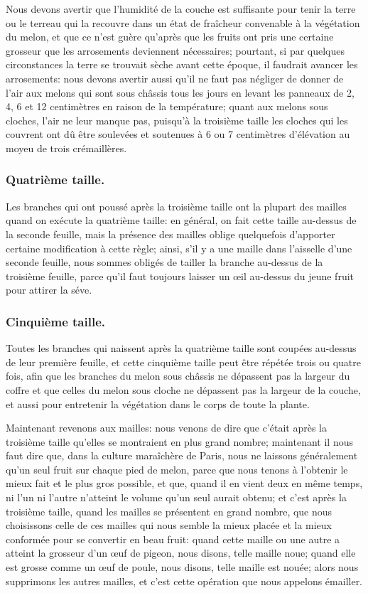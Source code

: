 \documentclass[10pt,a4paper]{book}
\begin{document}
Nous devons avertir que l'humidité de la couche est suffisante pour tenir la terre ou le terreau qui la recouvre dans un état de fraîcheur convenable à la végétation du melon, et que ce n'est guère qu'après que les fruits ont pris une certaine grosseur que les arrosements deviennent nécessaires; pourtant, si par quelques circonstances la terre se trouvait sèche avant cette époque, il faudrait avancer les arrosements: nous devons avertir aussi qu'il ne faut pas négliger de donner de l'air aux melons qui sont sous châssis tous les jours en levant les panneaux de 2, 4, 6 et 12 centimètres en raison de la température; quant aux melons sous cloches, l'air ne leur manque pas, puisqu'à la troisième taille les cloches qui les couvrent ont dû être soulevées et soutenues à 6 ou 7 centimètres d'élévation au moyeu de trois crémaillères.

\subsubsection{Quatrième taille.}

Les branches qui ont poussé après la troisième taille ont la plupart des mailles quand on exécute la quatrième taille: en général, on fait cette taille au-dessus de la seconde feuille, mais la présence des mailles oblige quelquefois d'apporter certaine modification à cette règle; ainsi, s'il y a une maille dans l'aisselle d'une seconde feuille, nous sommes obligés de tailler la branche au-dessus de la troisième feuille, parce qu'il faut toujours laisser un œil au-dessus du jeune fruit pour attirer la séve.

\subsubsection{Cinquième taille.}

Toutes les branches qui naissent après la quatrième taille sont coupées au-dessus de leur première feuille, et cette cinquième taille peut être répétée trois ou quatre fois, afin que les branches du melon sous châssis ne dépassent pas la largeur du coffre et que celles du melon sous cloche ne dépassent pas la largeur de la couche, et aussi pour entretenir la végétation dans le corps de toute la plante.

Maintenant revenons aux mailles: nous venons de dire que c'était après la troisième taille qu'elles se montraient en plus grand nombre; maintenant il nous faut dire que, dans la culture maraîchère de Paris, nous ne laissons généralement qu'un seul fruit sur chaque pied de melon, parce que nous tenons à l'obtenir le mieux fait et le plus gros possible, et que, quand il en vient deux en même temps, ni l'un ni l'autre n'atteint le volume qu'un seul aurait obtenu; et c'est après la troisième taille, quand les mailles se présentent en grand nombre, que nous choisissons celle de ces mailles qui nous semble la mieux placée et la mieux conformée pour se convertir en beau fruit: quand cette maille ou une autre a atteint la grosseur d'un œuf de pigeon, nous disons, telle maille noue; quand elle est grosse comme un œuf de poule, nous disons, telle maille est nouée; alors nous supprimons les autres mailles, et c'est cette opération que nous appelons émailler.
\end{document}
